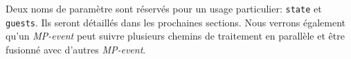 \noindent Deux noms de paramètre sont réservés pour un usage particulier: \texttt{state} et \texttt{guests}. Ils seront détaillés dans les prochaines sections. Nous verrons également qu'un \textit{MP-event} peut suivre plusieurs chemins de traitement en parallèle et être fusionné avec d'autres \textit{MP-event}. 


